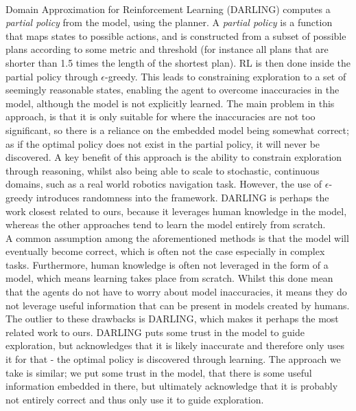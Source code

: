 \\Domain Approximation for Reinforcement Learning (DARLING) \cite{AIJ16-leonetti} computes a \textit{partial policy} from the model, using the planner. A \textit{partial policy} is a function that maps states to possible actions, and is constructed from a subset of possible plans according to some metric and threshold (for instance all plans that are shorter than 1.5 times the length of the shortest plan). RL is then done inside the partial policy through $\epsilon$-greedy. This leads to constraining exploration to a set of seemingly reasonable states, enabling the agent to overcome inaccuracies in the model, although the model is not explicitly learned. The main problem in this approach, is that it is only suitable for where the inaccuracies are not too significant, so there is a reliance on the embedded model being somewhat correct; as if the optimal policy does not exist in the partial policy, it will never be discovered. A key benefit of this approach is the ability to constrain exploration through reasoning, whilst also being able to scale to stochastic, continuous domains, such as a real world robotics navigation task. However, the use of $\epsilon$-greedy introduces randomness into the framework. DARLING is perhaps the work closest related to ours, because it leverages human knowledge in the model, whereas the other approaches tend to learn the model entirely from scratch.
\\A common assumption among the aforementioned methods is that the model will eventually become correct, which is often not the case especially in complex tasks. Furthermore, human knowledge is often not leveraged in the form of a model, which means learning takes place from scratch. Whilst this done mean that the agents do not have to worry about model inaccuracies, it means they do not leverage useful information that can be present in models created by humans. The outlier to these drawbacks is DARLING, which makes it perhaps the most related work to ours. DARLING puts some trust in the model to guide exploration, but acknowledges that it is likely inaccurate and therefore only uses it for that - the optimal policy is discovered through learning. The approach we take is similar; we put some trust in the model, that there is some useful information embedded in there, but ultimately acknowledge that it is probably not entirely correct and thus only use it to guide exploration.




